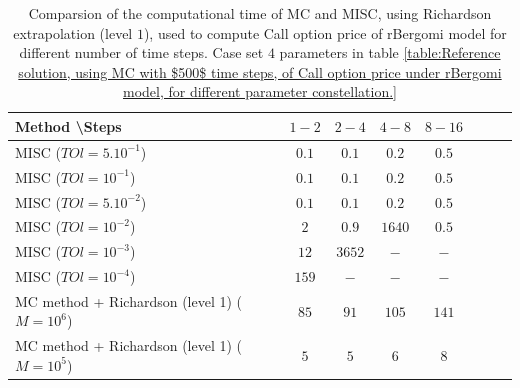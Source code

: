 \documentclass[11pt]{article}
\begin{document}
\begin{table}[h!]
	\centering
	\begin{tabular}{l*{6}{c}r}
		Method \textbackslash  Steps            & $1-2$ & $2-4$ & $4-8$ & $8-16$ &   \\
		\hline
		MISC ($TOl=5.10^{-1}$)  & $0.1$ & $0.1$ & $0.2$ & $0.5$  \\
		MISC ($TOl=10^{-1}$)  & $0.1$ & $0.1$ & $0.2$ & $0.5$   \\
		MISC ($TOl=5.10^{-2}$)  &$0.1$ & $0.1$ & $0.2$ & $0.5$   \\
		MISC ($TOl=10^{-2}$)  & $2$ & $0.9$ & $1640$ & $0.5$   \\	
		MISC ($TOl=10^{-3}$)  & $12$ & $3652$ & $-$ & $-$   \\
		MISC ($TOl=10^{-4}$)  & $159$ & $-$ & $-$ & $-$   \\
		\hline
		MC method + Richardson (level 1) ($M=10^{6}$)  &$85$ & $91$  & $105$  & $141$ \\
		MC method + Richardson (level 1) ($M=10^{5}$)  &$5$ & $5$  & $6$  & $8$ \\		
		\hline
	\end{tabular}
	\caption{Comparsion of the computational time of  MC and MISC, using Richardson extrapolation (level $1$), used to compute Call option price of rBergomi model for different number of time steps. Case set $4$ parameters in table \ref{table:Reference solution, using MC with $500$ time steps, of Call option price under rBergomi model, for different parameter constellation.}}
	\label{Comparsion of the computational time of  MC and MISC, using Richardson extrapolation (level $1$), used to compute Call option price of rBergomi model for different number of time steps. Case set $4$ parameters}
\end{table}



\FloatBarrier
\end{document}
